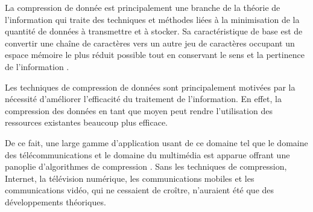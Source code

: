  La compression de donnée est principalement une branche de la théorie de l'information  qui traite des techniques et méthodes liées à la minimisation de la quantité de données à transmettre et à stocker.
Sa caractéristique de base est de convertir une chaîne de caractères vers un autre jeu de caractères occupant un espace mémoire le plus réduit possible tout en conservant le sens et la pertinence de l'information \citep{lelewer1987data}.

	Les techniques de compression de données sont principalement motivées par la nécessité d'améliorer l'efficacité du traitement de l'information. En effet, la compression des données en tant que moyen peut rendre l'utilisation des ressources existantes beaucoup plus efficace. 
	
	De ce fait, une large gamme d'application usant de ce domaine tel que le domaine des télécommunications et le domaine du multimédia est apparue offrant une panoplie d'algorithmes de compression \citep{sethi2014data}. Sans les techniques de compression, Internet, la télévision numérique, les communications mobiles et les communications vidéo, qui ne cessaient de croître, n'auraient été que des développements théoriques.
	
		
		
		
